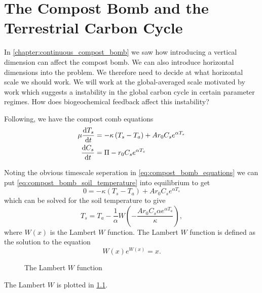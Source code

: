 \chapter{The Compost Bomb and the Terrestrial Carbon Cycle}
\label{chapter:global_bomb}
\graphicspath{{global_bomb/figs/}}



In \cref{chapter:continuous_compost_bomb} we saw how introducing a vertical dimension can affect the compost bomb.
We can also introduce horizontal dimensions into the problem. We therefore need to decide at what horizontal scale we
should work. We will work at the global-averaged scale motivated by work\parencite{Cox2006} which suggests a instability in the global
carbon cycle in certain parameter regimes. How does biogeochemical feedback affect this instability?

Following\parencite{Luke2011}, we have the compost comb equations
\begin{subequations}
  \label{eq:compost_bomb_equations}
  \begin{align}
    \mu \dv{T_s}{t} &= - \kappa \left(T_s - T_a\right) + Ar_0C_se^{\alpha T_s} \label{eq:compost_bomb_soil_temperature} \\
    \dv{C_s}{t} &= \Pi - r_0C_se^{\alpha T_s} \label{eq:compost_bomb_soil_carbon}
  \end{align}
\end{subequations}

Noting the obvious timescale seperation in \cref{eq:compost_bomb_equations} we can put \cref{eq:compost_bomb_soil_temperature} into
equilibrium to get
\begin{equation*}
  0 = - \kappa \left(T_s - T_a\right) + Ar_0C_se^{\alpha T_s}
\end{equation*}
which can be solved for the soil temperature to  give
\begin{equation}
  \label{eq:soil_temperature_equilibrium}
  T_s = T_a - \frac{1}{\alpha} W\left(-\frac{Ar_0C_s \alpha e^{\alpha T_a}}{\kappa} \right),
\end{equation}
where $W(x)$ is the Lambert $W$ function. The Lambert $W$ function is defined as the solution to the equation
\begin{equation}
  \label{eq:lambert_W}
  W(x)e^{W(x)} = x.
\end{equation}

\begin{figure}
  \centering
  \caption{The Lambert $W$ function}
  \label{fig:lambert_W}
\end{figure}
The Lambert $W$ is plotted in \cref{fig:lambert_W}.

